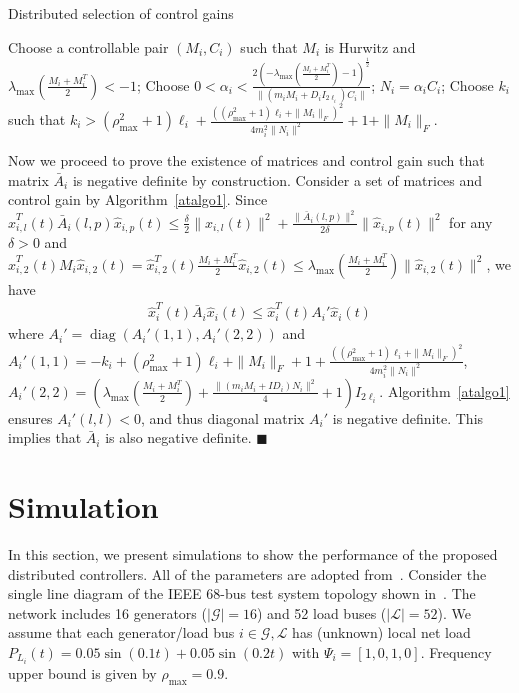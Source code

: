 \documentclass[journal]{IEEEtran}
\newcommand{\lbd}{{\lambda}}
\newcommand{\GG}{{\mathcal{G}}}
\newcommand{\LL}{{\mathcal{L}}}
\newcommand{\VV}{{\mathcal{V}}}
\newcommand{\diag}[1]{\operatorname{diag}(#1)}
\newcommand\oprocendsymbol{\hbox{$\blacksquare$}}
\newcommand\oprocend{\relax\ifmmode\else\unskip\hfill\fi\oprocendsymbol}
\begin{document}
\begin{algorithm}[t] \caption{Distributed selection of control gains}
\begin{algorithmic}[1]
\FOR{$i \in {\VV}$}
\STATE Choose a controllable pair $(M_i,C_i)$ such that $M_i$ is Hurwitz and $\lbd_{\max}(\frac{M_i+M_i^T}{2})<-1$;
\STATE Choose $0<\alpha_i < \frac{2 (-\lbd_{\max}(\frac{M_i+M_i^T}{2})-1)^{\frac{1}{2}}}{\|(m_iM_i+D_i I_{2\ell_i})C_i\|}$;
\STATE $N_i = \alpha_i C_i$;
\STATE Choose $k_{i}$ such that $k_{i}>(\rho_{\max}^2+1) \ell_i +\frac{((\rho_{\max}^2+1) \ell_i + \|M_i\|_F)^2}{4 m_i^2 \|N_i\|^2 } +1+ \|M_i\|_F$.
\ENDFOR
\end{algorithmic}
\label{atalgo1}
\end{algorithm}
Now we proceed to prove the existence of matrices and control gain such that matrix $\bar{A}_i$ is negative definite by construction.
Consider a set of matrices and control gain by Algorithm~\ref{atalgo1}.
Since $\hat{x}_{i,l}^T(t)\bar{A}_i(l,p)\hat{x}_{i,p}(t) \leq \frac{\delta}{2} \|\hat{x}_{i,l}(t)\|^2 + \frac{\|\bar{A}_i(l,p)\|^2}{2\delta}\|\hat{x}_{i,p}(t)\|^2$ for any $\delta>0$ and $\hat{x}_{i,2}^T(t)M_i\hat{x}_{i,2}(t)=\hat{x}_{i,2}^T(t)\frac{M_i+M_i^T}{2}\hat{x}_{i,2}(t)\leq \lbd_{\max}(\frac{M_i+M_i^T}{2})\|\hat{x}_{i,2}(t)\|^2$, we have 
\begin{align*}
\hat{x}_{i}^T(t) \bar{A}_i \hat{x}_{i}(t) \leq \hat{x}_{i}^T(t) A_i' \hat{x}_{i}(t) 
\end{align*}
where $A_i' = \diag{A_i'(1,1),A_i'(2,2)}$ and
$A_i'(1,1)=-k_{i} + (\rho_{\max}^2+1) \ell_i + \|M_i\|_F +1
+\frac{((\rho_{\max}^2+1) \ell_i + \|M_i\|_F)^2}{4m_i^2\|N_i\|^2}$,
$A_i'(2,2)=(\lbd_{\max}(\frac{M_i+M_i^T}{2}) +\frac{\|(m_iM_i+I D_i)N_i\|^2}{4}+1)I_{2 \ell_i}$.
Algorithm~\ref{atalgo1} ensures $A_i'(l,l)<0$, and thus diagonal matrix $A_i'$ is negative definite. This implies that $\bar{A}_i$ is also negative definite.
\oprocend

\section{Simulation}\label{sec:sim}
In this section, we present simulations to show the performance of the proposed distributed controllers.
All of the parameters are adopted from~\cite{Alvarado.Meng.ea:01,Kundar.Balu.Lauby:94}.
Consider the single line diagram of the IEEE 68-bus test system topology shown in~\cite{pal2006robust,rogers2012power}.
The network includes 16 generators ($|{\GG}|=16$) and 52 load buses ($|{\LL}|=52$). We assume that each generator/load bus $i \in {\GG}, {\LL}$ has (unknown) local net load $P_{L_i}(t) = 0.05 \sin (0.1 t) + 0.05 \sin (0.2 t)$ with $\Psi_{i} = [1, 0, 1, 0]$. Frequency upper bound is given by $\rho_{\max}=0.9$.
\end{document}
